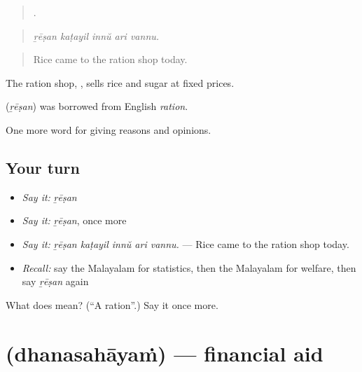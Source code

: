 \begin{quote}
    .
\end{quote}

\begin{quote}
\emph{ṟēṣan kaṭayil innŭ ari vannu.}
\end{quote}

\begin{quote}
Rice came to the ration shop today.
\end{quote}

The ration shop,  , sells rice and sugar at fixed prices.

\begin{cousinweb}
\textbf{} (\emph{ṟēṣan}) was borrowed from English \emph{ration}.
\end{cousinweb}

\begin{grammarlens}[title={What you've built}]
One more word for giving reasons and opinions.
\end{grammarlens}

\subsection*{Your turn}
\begin{itemize}
\raggedright
  \item \emph{Say it:} \emph{ṟēṣan}
  \item \emph{Say it:} \emph{ṟēṣan}, once more
  \item \emph{Say it:} \emph{ṟēṣan kaṭayil innŭ ari vannu.} — Rice came to the ration shop today.
  \item \emph{Recall:} say the Malayalam for statistics, then the Malayalam for welfare, then say \emph{ṟēṣan} again
\end{itemize}

\begin{tcolorbox}[breakable,colback=teal!4,colframe=teal!35!black,title={Before you move on}]
What does  mean? (\textquotedblleft{}A ration\textquotedblright{}.) Say it once more.
\end{tcolorbox}
\section[\texorpdfstring{\ml{ധനസഹായം} (dhanasahāyaṁ)}{ധനസഹായം (dhanasahāyaṁ)}]{ (dhanasahāyaṁ) — financial aid}

\label{lesson:ML-C429-dhanasahayam}



